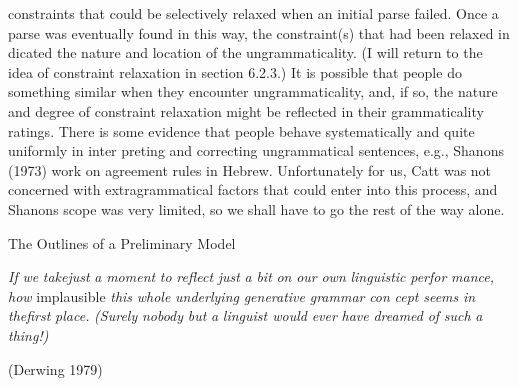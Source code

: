 \clearpage\setcounter{page}{1}\begin{styleTextbody}
constraints that could be selectively relaxed when an initial parse failed. Once a parse was eventually found in this way, the constraint(s) that had been relaxed in\- dicated the nature and location of the ungrammaticality. (I will return to the idea of constraint relaxation in section 6.2.3.) It is possible that people do something similar when they encounter ungrammaticality, and, if so, the nature and degree of constraint relaxation might be reflected in their grammaticality ratings. There is some evidence that people behave systematically and quite uniformly in inter\- preting and correcting ungrammatical sentences, e.g., Shanon{\textquotesingle}s (1973) work on agreement rules in Hebrew. Unfortunately for us, Catt was not concerned with extragrammatical factors that could enter into this process, and Shanon{\textquotesingle}s scope was very limited, so we shall have to go the rest of the way alone.
\end{styleTextbody}


\begin{styleHeadingviii}
The Outlines of a Preliminary Model
\end{styleHeadingviii}


\begin{styleStandard}
\textit{If}\textit{ }\textit{we}\textit{ }\textit{takejust}\textit{ }\textit{a}\textit{ }\textit{moment}\textit{ }\textit{to}\textit{ }\textit{reflect}\textit{ }\textit{just}\textit{ }\textit{a}\textit{ }\textit{bit}\textit{ }\textit{on}\textit{ }\textit{our}\textit{ }\textit{own}\textit{ }\textit{linguistic}\textit{ }\textit{perfor\-}\textit{ }\textit{mance,}\textit{ }\textit{how}\textit{ }implausible \textit{this}\textit{ }\textit{whole}\textit{ }\textit{{\textquotedbl}underlying}\textit{ }\textit{generative}\textit{ }\textit{grammar{\textquotedbl}}\textit{ }\textit{con\-}\textit{ }\textit{cept}\textit{ }\textit{seems}\textit{ }\textit{in}\textit{ }\textit{thefirst}\textit{ }\textit{place.}\textit{ }\textit{(Surely}\textit{ }\textit{nobody}\textit{ }\textit{but}\textit{ }\textit{a}\textit{ }\textit{linguist would}\textit{ }\textit{ever}\textit{ }\textit{have}\textit{ }\textit{dreamed}\textit{ }\textit{of}\textit{ }\textit{such}\textit{ }\textit{a}\textit{ }\textit{thing!)}
\end{styleStandard}


\begin{styleStandard}
(Derwing 1979)
\end{styleStandard}


